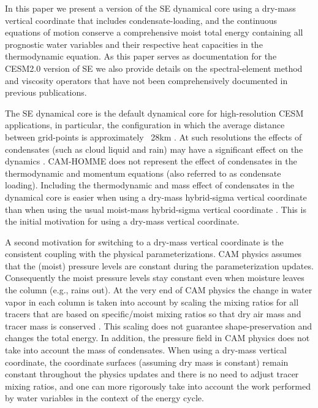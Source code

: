 \documentclass{agujournal}
\begin{document}
{In this paper we present a version of the SE dynamical core using a dry-mass vertical coordinate that includes condensate-loading, and the continuous equations of motion conserve a comprehensive moist total energy containing all prognostic water variables and their respective heat capacities in the thermodynamic equation. {\color{red}{The basic spectral-element method has not been changed but we present changes to the details of how hyperviscosity is applied and the vertical remapping that are not specific to the dry-mass vertical coordinate.}} As this paper serves as documentation for the CESM2.0 version of SE we also provide details on the spectral-element method and viscosity operators that have not been comprehensively documented in previous publications. 

The SE dynamical core is the default dynamical core for high-resolution CESM applications, in particular, the configuration in which the average distance between grid-points is approximately ~28km \citep{BetAl2016CC}. At such resolutions the effects of condensates (such as cloud liquid and rain) may have a significant effect on the dynamics \citep{BLDT2012GRL}. CAM-HOMME does not represent the effect of condensates in the thermodynamic and momentum equations (also referred to as condensate loading). Including the thermodynamic and mass effect of condensates in the dynamical core is easier when using a dry-mass hybrid-sigma vertical coordinate than when using the usual moist-mass hybrid-sigma vertical coordinate \citep[e.g., ][]{SB1981MWR}. This is the initial motivation for using a dry-mass vertical coordinate.

A second motivation for switching to a dry-mass vertical coordinate is the consistent coupling with the physical parameterizations. CAM physics assumes that the (moist) pressure levels are constant during the parameterization updates. Consequently the moist pressure levels stay constant even when moisture leaves the column (e.g., rains out). At the very end of CAM physics the change in water  vapor in each column is taken into account by scaling the mixing ratios for all tracers that are based on specific/moist mixing ratios so that dry air mass and tracer mass is conserved \citep[see Section 3.1.6 in ][]{CAM5}. This scaling does not guarantee shape-preservation and changes the total energy. In addition, the pressure field in CAM physics does not take into account the mass of condensates. When using a dry-mass vertical coordinate, the coordinate surfaces (assuming dry mass is constant) remain constant throughout the physics updates and there is no need to adjust tracer mixing ratios, and one can more rigorously take into account the work performed by water variables in the context of the energy cycle.

}
\end{document}
